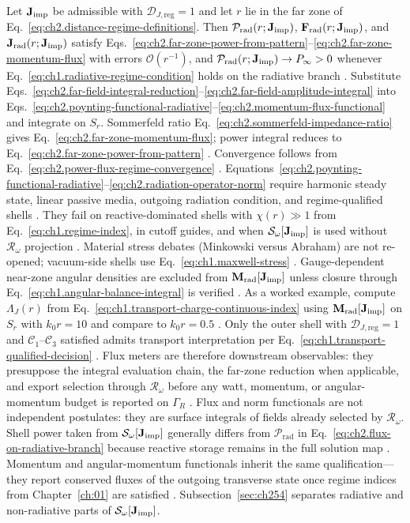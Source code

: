 Let \(\mathbf{J}_{\mathrm{imp}}\) be admissible with \(\mathcal{D}_{J,\mathrm{reg}}=1\) and let \(r\) lie
in the far zone of Eq.~\eqref{eq:ch2.distance-regime-definitions}. Then
\(\mathcal{P}_{\mathrm{rad}}(r;\mathbf{J}_{\mathrm{imp}})\), \(\mathbf{F}_{\mathrm{rad}}(r;\mathbf{J}_{\mathrm{imp}})\), and
\(\mathbf{J}_{\mathrm{rad}}(r;\mathbf{J}_{\mathrm{imp}})\) satisfy
Eqs.~\eqref{eq:ch2.far-zone-power-from-pattern}--\eqref{eq:ch2.far-zone-momentum-flux}
with errors \(\mathcal{O}(r^{-1})\), and \(\mathcal{P}_{\mathrm{rad}}(r;\mathbf{J}_{\mathrm{imp}})\to P_\infty>0\)
whenever Eq.~\eqref{eq:ch1.radiative-regime-condition} holds on the radiative branch
\cite{stratton1941}.
Substitute Eqs.~\eqref{eq:ch2.far-field-integral-reduction}--\eqref{eq:ch2.far-field-amplitude-integral}
into Eqs.~\eqref{eq:ch2.poynting-functional-radiative}--\eqref{eq:ch2.momentum-flux-functional}
and integrate on \(S_r\). Sommerfeld ratio Eq.~\eqref{eq:ch2.sommerfeld-impedance-ratio}
gives Eq.~\eqref{eq:ch2.far-zone-momentum-flux}; power integral reduces to
Eq.~\eqref{eq:ch2.far-zone-power-from-pattern} \cite{stratton1941}. Convergence
follows from Eq.~\eqref{eq:ch2.power-flux-regime-convergence} \cite{stratton1941}.
Equations~\eqref{eq:ch2.poynting-functional-radiative}--\eqref{eq:ch2.radiation-operator-norm}
require harmonic steady state, linear passive media, outgoing radiation condition, and regime-qualified
shells \cite{stratton1941}. They fail on reactive-dominated shells with
\(\chi(r)\gg 1\) from Eq.~\eqref{eq:ch1.regime-index}, in cutoff guides, and when
\(\mathcal{S}_\omega[\mathbf{J}_{\mathrm{imp}}]\) is used without \(\mathcal{R}_\omega\) projection
\cite{stratton1941}. Material stress debates (Minkowski versus Abraham) are not re-opened;
vacuum-side shells use Eq.~\eqref{eq:ch1.maxwell-stress} \cite{stratton1941}. Gauge-dependent
near-zone angular densities are excluded from \(\mathbf{M}_{\mathrm{rad}}[\mathbf{J}_{\mathrm{imp}}]\) unless
closure through Eq.~\eqref{eq:ch1.angular-balance-integral} is verified
\cite{belinfante1940}.
As a worked example, compute \(\Lambda_J(r)\) from Eq.~\eqref{eq:ch1.transport-charge-continuous-index} using
\(\mathbf{M}_{\mathrm{rad}}[\mathbf{J}_{\mathrm{imp}}]\) on \(S_r\) with \(k_0 r=10\) and compare to
\(k_0 r=0.5\) \cite{stratton1941}. Only the outer shell with
\(\mathcal{D}_{J,\mathrm{reg}}=1\) and \(\mathcal{C}_1\)--\(\mathcal{C}_3\) satisfied
admits transport interpretation per Eq.~\eqref{eq:ch1.transport-qualified-decision}
\cite{stratton1941}. Flux meters are therefore downstream observables: they presuppose the
integral evaluation chain, the far-zone reduction when applicable, and export selection through
$\mathcal{R}_\omega$ before any watt, momentum, or angular-momentum budget is reported on
$\Gamma_R$ \cite{harrington2001}.
Flux and norm functionals are not independent postulates: they are surface integrals of
fields already selected by $\mathcal{R}_\omega$. Shell power taken from
$\mathcal{S}_\omega[\mathbf{J}_{\mathrm{imp}}]$ generally differs from
$\mathcal{P}_{\mathrm{rad}}$ in Eq.~\eqref{eq:ch2.flux-on-radiative-branch} because reactive
storage remains in the full solution map \cite{stratton1941}. Momentum and
angular-momentum functionals inherit the same qualification---they report conserved fluxes of
the outgoing transverse state once regime indices from Chapter~\ref{ch:01} are satisfied
\cite{belinfante1940}. Subsection~\ref{sec:ch254} separates radiative and non-radiative parts
of $\mathcal{S}_\omega[\mathbf{J}_{\mathrm{imp}}]$.
